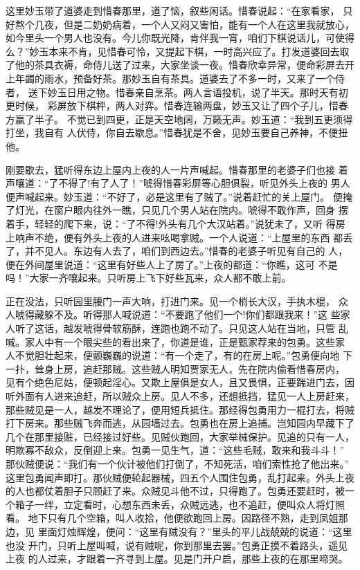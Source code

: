 这里妙玉带了道婆走到惜春那里，道了恼，叙些闲话。惜春说起：“在家看家，
只好熬个几夜，但是二奶奶病着，一个人又闷又害怕，能有一个人在这里我就放心，
如今里头一个男人也没有。今儿你既光降，肯伴我一宵，咱们下棋说话儿，可使得
么？”妙玉本来不肯，见惜春可怜，又提起下棋，一时高兴应了。打发道婆回去取
了他的茶具衣褥，命侍儿送了过来，大家坐谈一夜。惜春欣幸异常，便命彩屏去开
上年蠲的雨水，预备好茶。那妙玉自有茶具。道婆去了不多一时，又来了一个侍者，
送下妙玉日用之物。惜春亲自烹茶。两人言语投机，说了半天。那时天有初更时候，
彩屏放下棋枰，两人对弈。惜春连输两盘，妙玉又让了四个子儿，惜春方赢了半子。
不觉已到四更，正是天空地阔，万籁无声。妙玉道：“我到五更须得打坐，我自有
人伏侍，你自去歇息。”惜春犹是不舍，见妙玉要自己养神，不便扭他。

刚要歇去，猛听得东边上屋内上夜的人一片声喊起。惜春那里的老婆子们也接
着声嚷道：“了不得了!有了人了！”唬得惜春彩屏等心胆俱裂，听见外头上夜的
男人便声喊起来。妙玉道：“不好了，必是这里有了贼了。”说着赶忙的关上屋门。
便掩了灯光，在窗户眼内往外一瞧，只见几个男人站在院内。唬得不敢作声，回身
摆着手，轻轻的爬下来，说：“了不得!外头有几个大汉站着。”说犹未了，又听
得房上响声不绝，便有外头上夜的人进来吆喝拿贼。一个人说道：“上屋里的东西
都丢了，并不见人。东边有人去了，咱们到西边去。”惜春的老婆子听见有自己的
人，便在外间屋里说道：“这里有好些人上了房了。”上夜的都道：“你瞧，这可
不是吗！”大家一齐嚷起来。只听房上飞下好些瓦来，众人都不敢上前。

正在没法，只听园里腰门一声大响，打进门来。见一个梢长大汉，手执木棍，
众人唬得藏躲不及。听得那人喊说道：“不要跑了他们一个!你们都跟我来！”这
些家人听了这话，越发唬得骨软筋酥，连跑也跑不动了。只见这人站在当地，只管
乱喊。家人中有一个眼尖些的看出来了，你道是谁，正是甄家荐来的包勇。这些家
人不觉胆壮起来，便颤巍巍的说道：“有一个走了，有的在房上呢。”包勇便向地
下一扑，耸身上房，追赶那贼。这些贼人明知贾家无人，先在院内偷看惜春房内，
见有个绝色尼姑，便顿起淫心。又欺上屋俱是女人，且又畏惧，正要踹进门去，因
听外面有人进来追赶，所以贼众上房。见人不多，还想抵挡，猛见一人上房赶来，
那些贼见是一人，越发不理论了，便用短兵抵住。那经得包勇用力一棍打去，将贼
打下房来。那些贼飞奔而逃，从园墙过去。包勇也在房上追捕。岂知园内早藏下了
几个在那里接赃，已经接过好些。见贼伙跑回，大家举械保护。见追的只有一人，
明欺寡不敌众，反倒迎上来。包勇一见生气，道：“这些毛贼，敢来和我斗斗！”
那伙贼便说：“我们有一个伙计被他们打倒了，不知死活，咱们索性抢了他出来。”
这里包勇闻声即打。那伙贼便轮起器械，四五个人围住包勇，乱打起来。外头上夜
的人也都仗着胆子只顾赶了来。众贼见斗他不过，只得跑了。包勇还要赶时，被一
个箱子一绊，立定看时，心想东西未丢，众贼远逃，也不追赶，便叫众人将灯照看。
地下只有几个空箱，叫人收拾，他便欲跑回上房。因路径不熟，走到凤姐那边，见
里面灯烛辉煌，便问：“这里有贼没有？”里头的平儿战兢兢的说道：“这里也没
开门，只听上屋叫喊，说有贼呢，你到那里去罢。”包勇正摸不着路头，遥见上夜
的人过来，才跟着一齐寻到上屋。见是门开户启，那些上夜的在那里啼哭。

